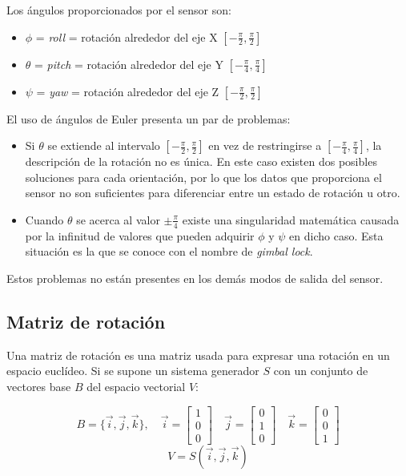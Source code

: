 \documentclass[12pt, a4paper]{report}
\begin{document}
Los ángulos proporcionados por el sensor son:

\begin{itemize}

\item $\phi$ = \textit{roll} = rotación alrededor del eje X $[-\frac{\pi}{2}, \frac{\pi}{2}]$

\item $\theta$ = \textit{pitch} = rotación alrededor del eje Y $[-\frac{\pi}{4}, \frac{\pi}{4}]$

\item $\psi$ = \textit{yaw} = rotación alrededor del eje Z $[-\frac{\pi}{2}, \frac{\pi}{2}]$

\end{itemize}

El uso de ángulos de Euler presenta un par de problemas:

\begin{itemize}

\item Si $\theta$ se extiende al intervalo $[-\frac{\pi}{2}, \frac{\pi}{2}]$ en vez de restringirse a $[-\frac{\pi}{4}, \frac{\pi}{4}]$, la descripción de la rotación no es única. En este caso existen dos posibles soluciones para cada orientación, por lo que los datos que proporciona el sensor no son suficientes para diferenciar entre un estado de rotación u otro.

\item Cuando $\theta$ se acerca al valor $\pm\frac{\pi}{4}$ existe una singularidad matemática causada por la infinitud de valores que pueden adquirir $\phi$ y $\psi$ en dicho caso. Esta situación es la que se conoce con el nombre de \textit{gimbal lock}.

\end{itemize}

Estos problemas no están presentes en los demás modos de salida del sensor.

\subsection{Matriz de rotación}

Una matriz de rotación es una matriz usada para expresar una rotación en un espacio euclídeo. Si se supone un sistema generador $S$ con un conjunto de vectores base $B$ del espacio vectorial $V$:

$$ B = \{\vec{i}, \vec{j}, \vec{k}\}, \quad \vec{i} = \begin{bmatrix} 1\\0\\0 \end{bmatrix} \quad  \vec{j} = \begin{bmatrix} 0\\1\\0 \end{bmatrix} \quad  \vec{k} = \begin{bmatrix} 0\\0\\1 \end{bmatrix} $$
$$ V = S(\vec{i}, \vec{j}, \vec{k}) $$
\end{document}
